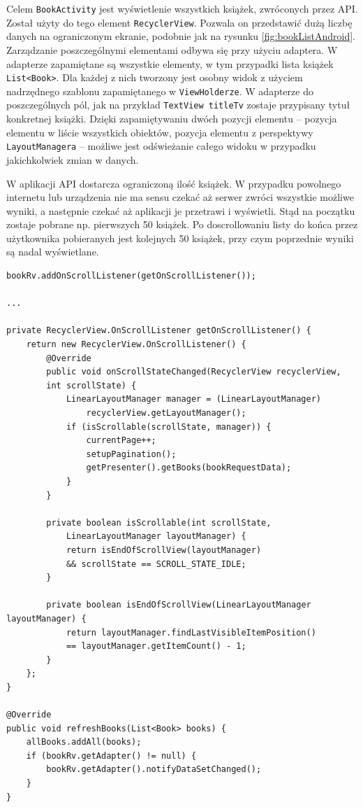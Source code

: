 \documentclass[twoside]{projektInzynierskiMS}
\begin{document}
Celem \verb`BookActivity` jest wyświetlenie wszystkich książek, zwróconych przez API. Został użyty do tego element \verb`RecyclerView`. Pozwala on przedstawić dużą liczbę danych na ograniczonym ekranie, podobnie jak na rysunku \ref{fig:bookListAndroid}. Zarządzanie poszczególnymi elementami odbywa się przy użyciu adaptera. W adapterze zapamiętane są wszystkie elementy, w tym przypadki lista książek \verb`List<Book>`. Dla każdej z nich tworzony jest osobny widok z użyciem nadrzędnego szablonu zapamiętanego w \verb`ViewHolderze`. W adapterze do poszczególnych pól, jak na przykład \verb`TextView titleTv` zostaje przypisany tytuł konkretnej książki. Dzięki zapamiętywaniu dwóch pozycji elementu -- pozycja elementu w liście wszystkich obiektów, pozycja elementu z perspektywy \verb`LayoutManagera` -- możliwe jest odświeżanie całego widoku w przypadku jakichkolwiek zmian w danych. 

W aplikacji API dostarcza ograniczoną ilość książek. W przypadku powolnego internetu lub urządzenia nie ma sensu czekać aż serwer zwróci wszystkie możliwe wyniki, a następnie czekać aż aplikacji je przetrawi i wyświetli. Stąd na początku zostaje pobrane np. pierwszych 50 książek. Po doscrollowaniu listy do końca przez użytkownika pobieranych jest kolejnych 50 książek, przy czym poprzednie wyniki są nadal wyświetlane. 

\begin{verbatim}
bookRv.addOnScrollListener(getOnScrollListener());

...

private RecyclerView.OnScrollListener getOnScrollListener() {
    return new RecyclerView.OnScrollListener() {
        @Override
        public void onScrollStateChanged(RecyclerView recyclerView, 
        int scrollState) {
            LinearLayoutManager manager = (LinearLayoutManager)
                recyclerView.getLayoutManager();
            if (isScrollable(scrollState, manager)) {
                currentPage++;
                setupPagination();
                getPresenter().getBooks(bookRequestData);
            }
        }

        private boolean isScrollable(int scrollState, 
            LinearLayoutManager layoutManager) {
            return isEndOfScrollView(layoutManager) 
            && scrollState == SCROLL_STATE_IDLE;
		}

        private boolean isEndOfScrollView(LinearLayoutManager layoutManager) {
            return layoutManager.findLastVisibleItemPosition() 
            == layoutManager.getItemCount() - 1;
        }
    };
}

@Override
public void refreshBooks(List<Book> books) {
    allBooks.addAll(books);
    if (bookRv.getAdapter() != null) {
        bookRv.getAdapter().notifyDataSetChanged();
    }
}
\end{verbatim}
\end{document}
